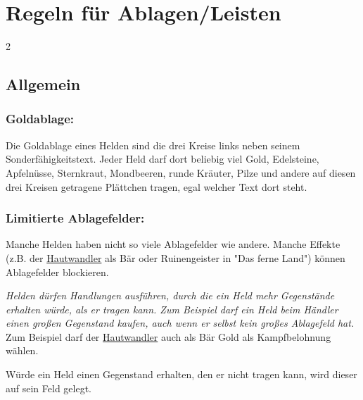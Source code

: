 \documentclass[10pt, a4paper, oneside]{book}
\newcommand{\fan}[1]{\textit{#1}}
\begin{document}
\chapter{Regeln für Ablagen/Leisten}
\label{ablagen-und-leisten}


\begin{multicols*}{2}\raggedcolumns

\section{Allgemein}


\begin{nobgcolor}

\subsection{Goldablage:}

Die Goldablage eines Helden sind die drei Kreise links neben seinem Sonderfähigkeitstext. Jeder Held darf dort beliebig viel Gold, Edelsteine, Apfelnüsse, Sternkraut, Mondbeeren, runde Kräuter, Pilze und andere auf diesen drei Kreisen getragene Plättchen tragen, egal welcher Text dort steht.








\subsection{Limitierte Ablagefelder:}

Manche Helden haben nicht so viele Ablagefelder wie andere. Manche Effekte (z.B. der \hyperref[hautwandler]{Hautwandler} als Bär oder Ruinengeister in "Das ferne Land") können Ablagefelder blockieren.

\fan{Helden dürfen Handlungen ausführen, durch die ein Held mehr Gegenstände erhalten würde, als er tragen kann. Zum Beispiel darf ein Held beim Händler einen großen Gegenstand kaufen, auch wenn er selbst kein großes Ablagefeld hat.} Zum Beispiel darf der \hyperref[hautwandler]{Hautwandler} auch als Bär Gold als Kampfbelohnung wählen.
\supercite{dh-faq}

Würde ein Held einen Gegenstand erhalten, den er nicht tragen kann, wird dieser auf sein Feld gelegt.
\supercite{dridn-faq}


\end{nobgcolor}
\end{multicols*}
\end{document}
